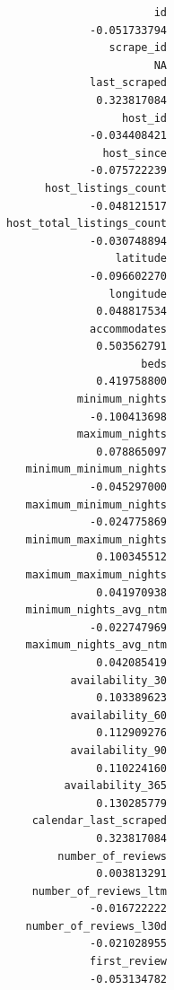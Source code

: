 \documentclass[
  journal,
]{IEEEtran}%
\begin{document}
\begin{verbatim}
                                          id 
                                -0.051733794 
                                   scrape_id 
                                          NA 
                                last_scraped 
                                 0.323817084 
                                     host_id 
                                -0.034408421 
                                  host_since 
                                -0.075722239 
                         host_listings_count 
                                -0.048121517 
                   host_total_listings_count 
                                -0.030748894 
                                    latitude 
                                -0.096602270 
                                   longitude 
                                 0.048817534 
                                accommodates 
                                 0.503562791 
                                        beds 
                                 0.419758800 
                              minimum_nights 
                                -0.100413698 
                              maximum_nights 
                                 0.078865097 
                      minimum_minimum_nights 
                                -0.045297000 
                      maximum_minimum_nights 
                                -0.024775869 
                      minimum_maximum_nights 
                                 0.100345512 
                      maximum_maximum_nights 
                                 0.041970938 
                      minimum_nights_avg_ntm 
                                -0.022747969 
                      maximum_nights_avg_ntm 
                                 0.042085419 
                             availability_30 
                                 0.103389623 
                             availability_60 
                                 0.112909276 
                             availability_90 
                                 0.110224160 
                            availability_365 
                                 0.130285779 
                       calendar_last_scraped 
                                 0.323817084 
                           number_of_reviews 
                                 0.003813291 
                       number_of_reviews_ltm 
                                -0.016722222 
                      number_of_reviews_l30d 
                                -0.021028955 
                                first_review 
                                -0.053134782 

\end{verbatim}
\end{document}
